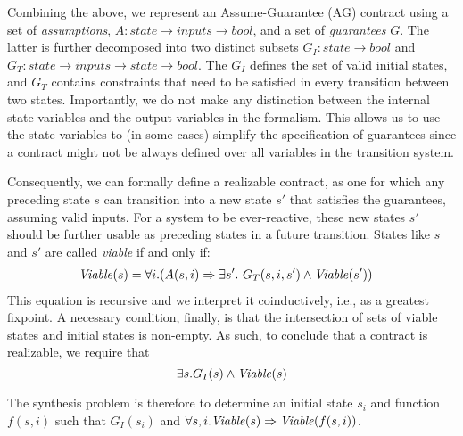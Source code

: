 Combining the above, we represent an Assume-Guarantee (AG) contract using a set
of \emph{assumptions}, $A: state \rightarrow inputs \rightarrow bool$,
and a set of \emph{guarantees} $G$. The latter is further decomposed into two
distinct subsets $G_I: state \rightarrow bool$ and $G_T: state \rightarrow
inputs \rightarrow state \rightarrow bool$. The $G_I$ defines the set of valid
initial states, and $G_T$ contains constraints that need to be satisfied in
every transition between two states. Importantly, we
do not make any distinction between the internal state variables and the output variables in the
formalism. This allows us to use the state variables to (in some cases)
simplify the specification of guarantees since a contract
might not be always defined over all variables in the transition system.

Consequently, we can formally define a realizable contract, as one for which any
preceding state $s$ can  transition into a new state $s'$ that satisfies
the guarantees, assuming valid inputs. For a system to be ever-reactive, these
new states $s'$ should be further usable as preceding states in a future
transition. States like $s$ and $s'$ are called \textit{viable} if
and only if:
\begin{align}
\begin{split}
  {\mathit {Viable}}(s) &=
  \forall i. (A(s, i) \Rightarrow \exists s'.~ G_T(s, i,s')
\land {\mathit {Viable}}(s'))
\label{eq:viable}
\end{split}
\end{align}
This equation is recursive and we interpret it coinductively, i.e., as a
greatest fixpoint.
A necessary condition, finally, is that the intersection of sets of viable states
and initial states is non-empty. As such, to conclude that a contract
is realizable, we require that
\begin{equation}
\exists s. G_I(s) \land {\mathit {Viable}}(s)
\label{eq:nonempty}
\end{equation}

\noindent The synthesis problem is therefore to determine an initial state $s_i$ and function $f(s, i)$ such that $G_I(s_i)$ and $\forall s, i . {\mathit {Viable}}(s) \Rightarrow {\mathit {Viable}}(f(s, i))$.

\iffalse
The intuition behind our proposed algorithm in this paper relies on the
discovery of a fixpoint $F$ that only contains viable states.  We can determine whether $F$ is a fixpoint by proving the validity of the following formula:
\[
\forall s,i. \ (F(s) \land A(s,i) \Rightarrow \exists s'.G_{T}(s,i,s') \land F(s'))
\]

\noindent In the case where the greatest fixpoint $F$ is non-empty, we check whether it satisfies $G_{I}$ for some initial state.  If so, we proceed by extracting a witnessing initial state and witnessing skolem function $f(s, i)$ to determine $s'$ that is, by construction, guaranteed to satisfy the specification.

To achieve both the fixpoint generation and the witness extraction, we depend on \aeval, a solver for $\forall\exists$-formulas.


\fi